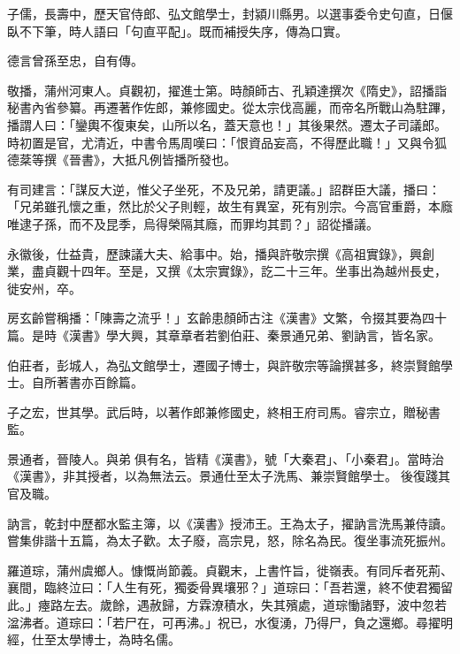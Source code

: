 \begin{pinyinscope}
 子儒，長壽中，歷天官侍郎、弘文館學士，封潁川縣男。以選事委令史句直，日偃臥不下筆，時人語曰「句直平配」。既而補授失序，傳為口實。



 德言曾孫至忠，自有傳。



 敬播，蒲州河東人。貞觀初，擢進士第。時顏師古、孔穎達撰次《隋史》，詔播詣秘書內省參纂。再遷著作佐郎，兼修國史。從太宗伐高麗，而帝名所戰山為駐蹕，播謂人曰：「鑾輿不復東矣，山所以名，蓋天意也！」其後果然。遷太子司議郎。時初置是官，尤清近，中書令馬周嘆曰：「恨資品妄高，不得歷此職！」又與令狐德棻等撰《晉書》，大抵凡例皆播所發也。



 有司建言：「謀反大逆，惟父子坐死，不及兄弟，請更議。」詔群臣大議，播曰：「兄弟雖孔懷之重，然比於父子則輕，故生有異室，死有別宗。今高官重爵，本廕唯逮子孫，而不及昆季，烏得榮隔其廕，而罪均其罰？」詔從播議。



 永徽後，仕益貴，歷諫議大夫、給事中。始，播與許敬宗撰《高祖實錄》，興創業，盡貞觀十四年。至是，又撰《太宗實錄》，訖二十三年。坐事出為越州長史，徙安州，卒。



 房玄齡嘗稱播：「陳壽之流乎！」玄齡患顏師古注《漢書》文繁，令掇其要為四十篇。是時《漢書》學大興，其章章者若劉伯莊、秦景通兄弟、劉訥言，皆名家。



 伯莊者，彭城人，為弘文館學士，遷國子博士，與許敬宗等論撰甚多，終崇賢館學士。自所著書亦百餘篇。



 子之宏，世其學。武后時，以著作郎兼修國史，終相王府司馬。睿宗立，贈秘書監。



 景通者，晉陵人。與弟俱有名，皆精《漢書》，號「大秦君」、「小秦君」。當時治《漢書》，非其授者，以為無法云。景通仕至太子洗馬、兼崇賢館學士。後復踐其官及職。



 訥言，乾封中歷都水監主簿，以《漢書》授沛王。王為太子，擢訥言洗馬兼侍讀。嘗集俳諧十五篇，為太子歡。太子廢，高宗見，怒，除名為民。復坐事流死振州。



 羅道琮，蒲州虞鄉人。慷慨尚節義。貞觀末，上書忤旨，徙嶺表。有同斥者死荊、襄間，臨終泣曰：「人生有死，獨委骨異壤邪？」道琮曰：「吾若還，終不使君獨留此。」瘞路左去。歲餘，遇赦歸，方霖潦積水，失其殯處，道琮慟諸野，波中忽若湓沸者。道琮曰：「若尸在，可再沸。」祝已，水復湧，乃得尸，負之還鄉。尋擢明經，仕至太學博士，為時名儒。



\end{pinyinscope}